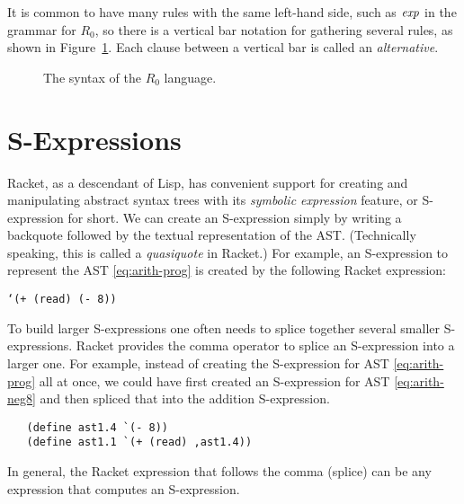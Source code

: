 \documentclass[11pt]{book}
\begin{document}
It is common to have many rules with the same left-hand side, such as
$\mathit{exp}$ in the grammar for $R_0$, so there is a vertical bar notation
for gathering several rules, as shown in
Figure~\ref{fig:r0-syntax}. Each clause between a vertical bar is
called an {\em alternative}.

\begin{figure}[tbp]
\caption{The syntax of the $R_0$ language.}
\label{fig:r0-syntax}
\end{figure}

\section{S-Expressions}
\label{sec:s-expr}

Racket, as a descendant of Lisp, has
convenient support for creating and manipulating abstract syntax trees
with its \emph{symbolic expression} feature, or S-expression for
short. We can create an S-expression simply by writing a backquote
followed by the textual representation of the AST. (Technically
speaking, this is called a \emph{quasiquote} in Racket.)  For example,
an S-expression to represent the AST \eqref{eq:arith-prog} is created
by the following Racket expression:
\begin{center}
\texttt{`(+ (read) (- 8))}
\end{center}

To build larger S-expressions one often needs to splice together
several smaller S-expressions. Racket provides the comma operator to
splice an S-expression into a larger one. For example, instead of
creating the S-expression for AST \eqref{eq:arith-prog} all at once,
we could have first created an S-expression for AST
\eqref{eq:arith-neg8} and then spliced that into the addition
S-expression.
\begin{lstlisting}
   (define ast1.4 `(- 8))
   (define ast1.1 `(+ (read) ,ast1.4))
\end{lstlisting}
In general, the Racket expression that follows the comma (splice)
can be any expression that computes an S-expression.
\end{document}
